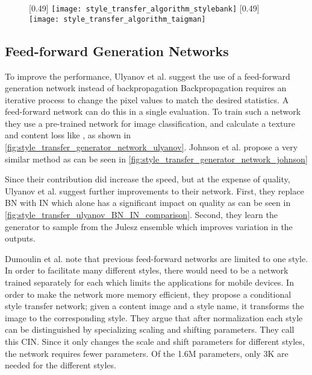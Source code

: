 \begin{figure}
	\centering
	 [0.49\textwidth] {
		\label{fig:style_transfer_algorithm_stylebank}
		\texttt{[image: style\_transfer\_algorithm\_stylebank]}%
	}
	 [0.49\textwidth] {
		\texttt{[image: style\_transfer\_algorithm\_taigman]}%
		\label{fig:style_transfer_algorithm_taigman}
	}
\end{figure}

\subsection{Feed-forward Generation Networks}
To improve the performance, Ulyanov et al. \cite{Ulyanov2016} suggest the use of a feed-forward generation network instead of backpropagation
Backpropagation requires an iterative process to change the pixel values to match the desired statistics.
A feed-forward network can do this in a single evaluation.
To train such a network they use a pre-trained network for image classification, and calculate a texture and content loss like \cite{Gatys2016}, as shown in \ref{fig:style_transfer_generator_network_ulyanov}.
Johnson et al. \cite{Johnson2016} propose a very similar method as can be seen in \ref{fig:style_transfer_generator_network_johnson}

Since their contribution did increase the speed, but at the expense of quality, Ulyanov et al. \cite{Ulyanov2017} suggest further improvements to their network.
First, they replace \gls{BN} \cite{Ioffe2015} with \gls{IN} which alone has a significant impact on quality as can be seen in \ref{fig:style_transfer_ulyanov_BN_IN_comparison}.
Second, they learn the generator to sample from the Julesz ensemble \cite{Zhu2000} which improves variation in the outputs.

Dumoulin et al. \cite{Dumoulin2016} note that previous feed-forward networks are limited to one style.
In order to facilitate many different styles, there would need to be a network trained separately for each which limits the applications for mobile devices.
In order to make the network more memory efficient, they propose a conditional style transfer network; given a content image and a style name, it transforms the image to the corresponding style.
They argue that after normalization each style can be distinguished by specializing scaling and shifting parameters.
They call this \gls{CIN}.
Since it only changes the scale and shift parameters for different styles, the network requires fewer parameters.
Of the 1.6M parameters, only 3K are needed for the different styles.

